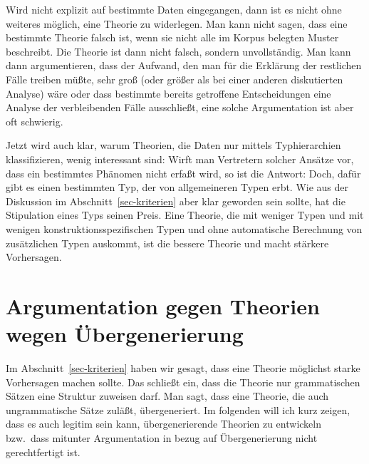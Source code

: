Wird nicht explizit auf bestimmte Daten eingegangen, dann ist es nicht ohne weiteres möglich,
eine Theorie zu widerlegen. Man kann \zb nicht sagen, dass eine bestimmte Theorie %
falsch ist, wenn sie nicht alle im Korpus belegten Muster %
beschreibt. Die Theorie ist dann nicht falsch, sondern unvollständig. Man kann dann argumentieren,
dass der Aufwand, den man für die Erklärung der restlichen Fälle treiben müßte, sehr groß (oder größer als bei einer
anderen diskutierten Analyse) wäre oder dass bestimmte bereits getroffene Entscheidungen eine Analyse der verbleibenden Fälle ausschließt,
eine solche Argumentation ist aber oft schwierig. 

Jetzt wird auch klar, warum Theorien, die Daten nur mittels Typhierarchien klassifizieren,
wenig interessant sind: Wirft man Vertretern solcher Ansätze vor, dass ein bestimmtes Phänomen
nicht erfaßt wird, so ist die Antwort: Doch, dafür gibt es einen bestimmten Typ, der von allgemeineren
Typen erbt. Wie aus der Diskussion im Abschnitt~\ref{sec-kriterien} aber klar geworden sein sollte,
hat die Stipulation eines Typs seinen Preis. Eine Theorie, die mit weniger Typen und mit wenigen
konstruktionsspezifischen Typen und ohne automatische Berechnung von zusätzlichen Typen
auskommt, ist die bessere Theorie und macht stärkere Vorhersagen.






\section{Argumentation gegen Theorien wegen Übergenerierung}

Im Abschnitt~\ref{sec-kriterien} haben wir gesagt, dass eine Theorie möglichst starke Vorhersagen
machen sollte. Das schließt ein, dass die Theorie nur grammatischen Sätzen eine Struktur zuweisen
darf. Man sagt, dass eine Theorie, die auch ungrammatische Sätze zuläßt, übergeneriert. Im folgenden
will ich kurz zeigen, dass es auch legitim sein kann, übergenerierende Theorien zu entwickeln bzw.\
dass mitunter Argumentation in bezug auf Übergenerierung nicht gerechtfertigt ist.

